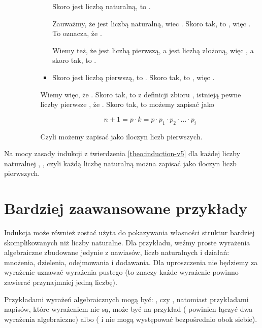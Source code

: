 \begin{example}
\begin{enumerate}
\begin{itemize}
\begin{itemize}
\begin{itemize}
                Skoro  jest liczbą naturalną, to .
                
                Zauważmy, że  jest liczbą naturalną, wiec . Skoro tak, to , więc . To oznacza, że .
                
                Wiemy też, że  jest liczbą pierwszą, a  jest liczbą złożoną, więc , a skoro tak, to .
                
                \item {}
                
                Skoro  jest liczbą pierwszą, to . Skoro tak, to , więc .
            \end{itemize}
            
            Wiemy więc, że . Skoro tak, to z definicji zbioru , istnieją pewne liczby pierwsze , że . Skoro tak, to  możemy zapisać jako 
            
            \[
                n+1 = p \cdot k = p \cdot p_1 \cdot p_2 \cdot \dots \cdot p_i
            \]
            
            Czyli  możemy zapisać jako iloczyn liczb pierwszych.
        \end{itemize}
    \end{itemize}
\end{enumerate}
Na mocy zasady indukcji z twierdzenia \ref{theo:induction-v5} dla każdej liczby naturalnej , , czyli każdą liczbę naturalną  można zapisać jako iloczyn liczb pierwszych.
\end{example}

\section{Bardziej zaawansowane przykłady}

Indukcja może również zostać użyta do pokazywania własności struktur bardziej skomplikowanych niż liczby naturalne. Dla przykładu, weźmy proste wyrażenia algebraiczne zbudowane jedynie z nawiasów, liczb naturalnych i działań: mnożenia, dzielenia, odejmowania i dodawania. Dla uproszczenia nie będziemy za wyrażenie uznawać wyrażenia pustego (to znaczy każde wyrażenie powinno zawierać przynajmniej jedną liczbę). 

Przykładami wyrażeń algebraicznych mogą być: ,  czy , natomiast przykładami napisów, które wyrażeniem nie są, może być na przykład  (\m{+} powinien łączyć dwa wyrażenia algebraiczne) albo  (\m{+} i \m{\cdot} nie mogą występować bezpośrednio obok siebie).

